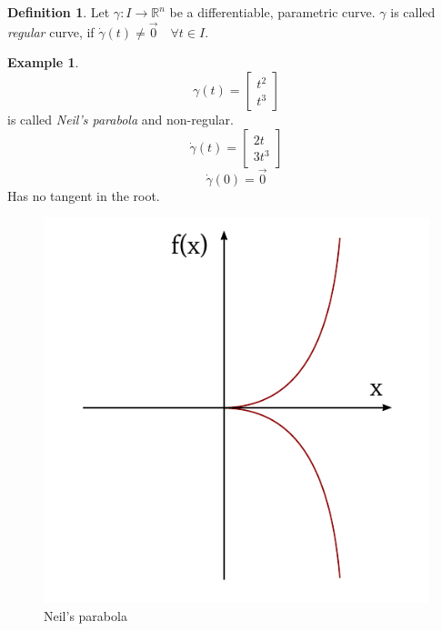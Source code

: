 \documentclass[a4paper,landscape,twocolumn]{article}
\theoremstyle{definition}
\newtheorem{defi}{Definition}
\newtheorem{ex}{Example}
\begin{document}
\begin{defi}
  Let $\gamma: I \to \mathbb R^n$ be a differentiable, parametric curve.
  $\gamma$ is called \emph{regular} curve, if $\dot\gamma(t) \neq \vec0 \quad \forall t \in I$.
\end{defi}

\begin{ex}
  \[ \gamma(t) = \begin{bmatrix} t^2 \\ t^3 \end{bmatrix} \]
  is called \emph{Neil's parabola} and non-regular.
  \[ \dot\gamma(t) = \begin{bmatrix} 2t \\ 3t^3 \end{bmatrix} \]
  \[ \dot\gamma(0) = \vec0 \]
  Has no tangent in the root.
\end{ex}

\begin{figure}[!h]
  \begin{center}
    \includegraphics{img/neils_parabola.pdf}
    \caption{Neil's parabola}
  \end{center}
\end{figure}
\end{document}
